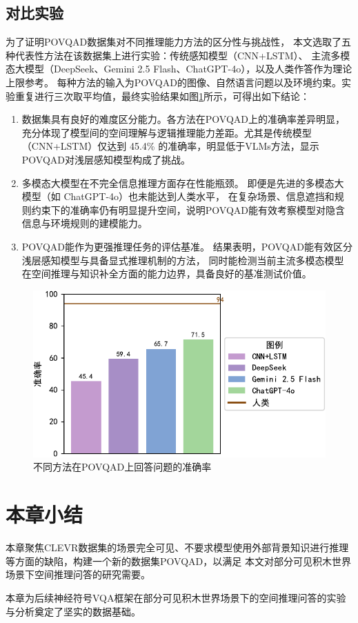 \subsection{对比实验}
为了证明POVQAD数据集对不同推理能力方法的区分性与挑战性，
本文选取了五种代表性方法在该数据集上进行实验：传统感知模型（CNN+LSTM）、
主流多模态大模型（DeepSeek、Gemini 2.5 Flash、ChatGPT-4o），以及人类作答作为理论上限参考。
每种方法的输入为POVQAD的图像、自然语言问题以及环境约束。实验重复进行三次取平均值，最终实验结果如图\ref{fig:dataset-comparison}所示，可得出如下结论：
\begin{enumerate}[nosep]
\item 数据集具有良好的难度区分能力。各方法在POVQAD上的准确率差异明显，充分体现了模型间的空间理解与逻辑推理能力差距。尤其是传统模型（CNN+LSTM）仅达到 45.4\% 的准确率，明显低于VLMs方法，显示POVQAD对浅层感知模型构成了挑战。
\item 多模态大模型在不完全信息推理方面存在性能瓶颈。
即便是先进的多模态大模型（如 ChatGPT-4o）也未能达到人类水平，
在复杂场景、信息遮挡和规则约束下的准确率仍有明显提升空间，说明POVQAD能有效考察模型对隐含信息与环境规则的建模能力。
\item POVQAD能作为更强推理任务的评估基准。
结果表明，POVQAD能有效区分浅层感知模型与具备显式推理机制的方法，
同时能检测当前主流多模态模型在空间推理与知识补全方面的能力边界，具备良好的基准测试价值。
\end{enumerate}
\begin{figure}[h]
\centering
\includegraphics[scale=0.8]{figures/dataset-experiment-crop.pdf}
\caption{不同方法在POVQAD上回答问题的准确率}
\label{fig:dataset-comparison}
\end{figure}
\section{本章小结}
本章聚焦CLEVR数据集的场景完全可见、不要求模型使用外部背景知识进行推理等方面的缺陷，构建一个新的数据集POVQAD，以满足
本文对部分可见积木世界场景下空间推理问答的研究需要。

本章为后续神经符号VQA框架在部分可见积木世界场景下的空间推理问答的实验与分析奠定了坚实的数据基础。
